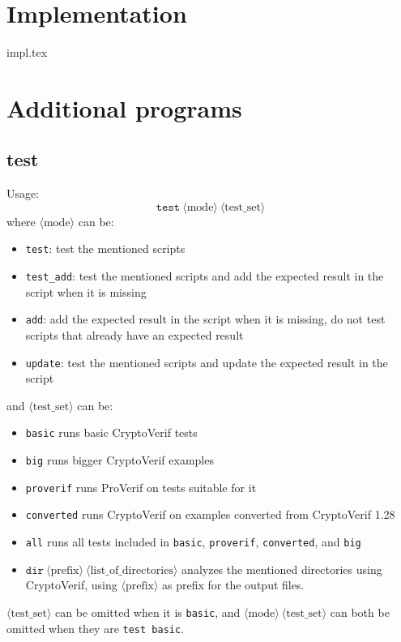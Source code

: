 \documentclass{article}
\newcommand{\nonterm}[1]{\langle\textrm{#1}\rangle}
\begin{document}
\section{Implementation}
 {impl.tex}


\section{Additional programs}

\subsection{\ttfamily test}

Usage: 
\[\mathtt{test}\ \nonterm{mode}\ \nonterm{test\_set}\]
where $\nonterm{mode}$ can be:
\begin{itemize}
\item \texttt{test}: test the mentioned scripts
\item \texttt{test\_add}: test the mentioned scripts and add the 
expected result in the script when it is missing
\item \texttt{add}: add the expected result in the script when it is missing, 
do not test scripts that already have an expected result
\item \texttt{update}: test the mentioned scripts and update the expected
result in the script
\end{itemize}
and $\nonterm{test\_set}$ can be:
\begin{itemize}
\item \texttt{basic} runs basic CryptoVerif tests
\item \texttt{big} runs bigger CryptoVerif examples
\item \texttt{proverif} runs ProVerif on tests suitable for it
\item \texttt{converted} runs CryptoVerif on examples converted from CryptoVerif 1.28
\item \texttt{all} runs all tests included in \texttt{basic}, \texttt{proverif}, \texttt{converted}, and \texttt{big}
\item $\texttt{dir}\ \nonterm{prefix}\ \nonterm{list\_of\_directories}$ analyzes the mentioned directories
using CryptoVerif, using $\nonterm{prefix}$ as prefix for the output files.
\end{itemize}
$\nonterm{test\_set}$ can be omitted when it is \texttt{basic},
and $\nonterm{mode}\ \nonterm{test\_set}$ can both be omitted when they are
\texttt{test\ basic}.
\end{document}
